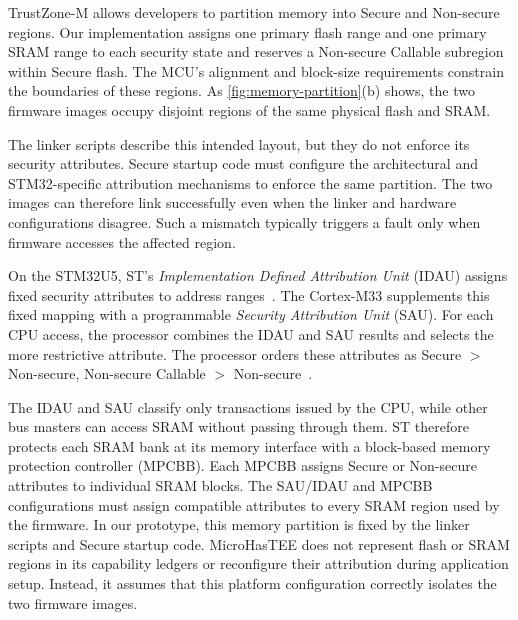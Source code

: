 \documentclass[sigconf]{acmart}
\begin{document}
TrustZone-M allows developers to partition memory into Secure and Non-secure regions.
Our implementation assigns one primary flash range and one primary SRAM range to each security state and reserves a Non-secure Callable subregion within Secure flash.
The MCU's alignment and block-size requirements constrain the boundaries of these regions.
As \cref{fig:memory-partition}(b) shows, the two firmware images occupy disjoint regions of the same physical flash and SRAM.

The linker scripts describe this intended layout, but they do not enforce its security attributes.
Secure startup code must configure the architectural and STM32-specific attribution mechanisms to enforce the same partition.
The two images can therefore link successfully even when the linker and hardware configurations disagree.
Such a mismatch typically triggers a fault only when firmware accesses the affected region.

On the STM32U5, ST's \textit{Implementation Defined Attribution Unit} (IDAU) assigns fixed security attributes to address ranges~\cite{stm32u5ReferenceManual}.
The Cortex-M33 supplements this fixed mapping with a programmable \textit{Security Attribution Unit} (SAU).
For each CPU access, the processor combines the IDAU and SAU results and selects the more restrictive attribute.
The processor orders these attributes as Secure \(>\) Non-secure, Non-secure Callable \(>\) Non-secure~\cite{armTrustZoneM}.

The IDAU and SAU classify only transactions issued by the CPU, while other bus masters can access SRAM without passing through them.
ST therefore protects each SRAM bank at its memory interface with a block-based memory protection controller (MPCBB).
Each MPCBB assigns Secure or Non-secure attributes to individual SRAM blocks.
The SAU/IDAU and MPCBB configurations must assign compatible attributes to every SRAM region used by the firmware.
In our prototype, this memory partition is fixed by the linker scripts and Secure startup code.
MicroHasTEE does not represent flash or SRAM regions in its capability ledgers or reconfigure their attribution during application setup.
Instead, it assumes that this platform configuration correctly isolates the two firmware images.
\end{document}
